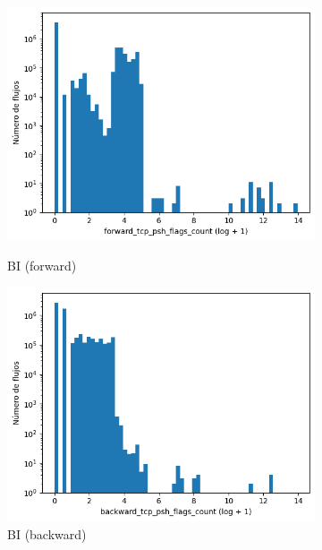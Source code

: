 \begin{figure}[H]
\begin{subfigure}[b]{0.26\textwidth}
        \includegraphics[width=\linewidth]{media/packet_pincer_botiot/forward_tcp_psh_flags_count_log_x_log_y.png}
        \caption{BI (forward)}
        \includegraphics[width=\linewidth]{media/packet_pincer_botiot/backward_tcp_psh_flags_count_log_x_log_y.png}
        \caption{BI (backward)}
    \end{subfigure}
    \hfill
    \begin{subfigure}[b]{0.26\textwidth}
        \centering

\end{subfigure}
\end{figure}
